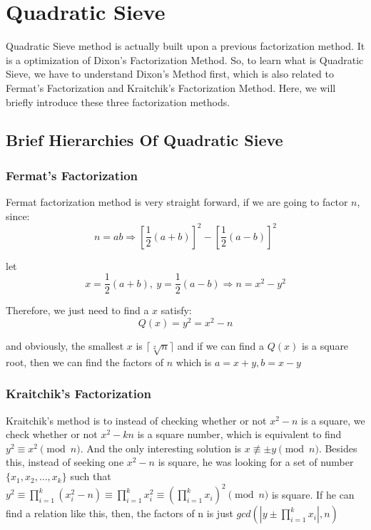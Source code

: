 \documentclass[12pt]{article} %
\begin{document}
	
	\section{Quadratic Sieve}
	
	Quadratic Sieve method is actually built upon a previous factorization method. It is a optimization of Dixon's Factorization Method. So, to learn what is Quadratic Sieve, we have to understand Dixon's Method first, which is also related to Fermat's Factorization and Kraitchik's Factorization Method. Here, we will briefly introduce these three factorization methods.
	
	\subsection {Brief Hierarchies Of Quadratic Sieve}
	
	\subsubsection {Fermat's Factorization}
	Fermat factorization method is very straight forward, if we are going to factor $n$, since: $$n = ab \Rightarrow \left [\frac{1}{2}(a+b) \right ]^{2} - \left [\frac{1}{2}(a-b) \right ]^{2}$$
	
	let $$ x= \frac{1}{2}(a+b),\ y= \frac{1}{2}(a-b) \Rightarrow n = x^2 - y^2$$ 
	
	Therefore, we just need to find a $x$ satisfy: $$Q(x) = y^2 = x^2 - n$$ 
	
	and obviously, the smallest $x$ is $\lceil \sqrt[2]{n}\rceil$ and if we can find a $Q(x)$ is a square root, then we can find the factors of $n$ which is $a=x+y, b=x-y$
	
	\subsubsection {Kraitchik's Factorization}
	Kraitchik's method is to instead of checking whether or not $x^2-n$ is a square, we check whether or not $x^2 - kn$ is a square number, which is equivalent to find $y^2 \equiv x^2 \pmod{n} $. And the only interesting solution is $ x \not\equiv \pm y \pmod{n}$. Besides this, instead of seeking one $x^2-n$ is square, he was looking for a set of number $ \{x_1, x_2, \dots, x_k\} $ such that $\displaystyle y^2 \equiv \prod_{i=1}^k{(x_i^2 - n)} \equiv \prod_{i=1}^k{x_i^2} \equiv \left (\prod_{i=1}^k{x_i}\right)^2 \pmod{n} $ is square. If he can find a relation like this, then, the factors of n is just $\displaystyle gcd(|y \pm \prod_{i=1}^k{x_i}|, n)$
	
\end{document}
